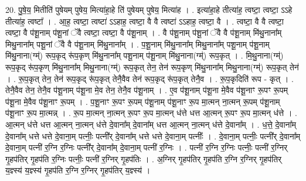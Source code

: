 \documentclass[17pt]{extarticle}
\begin{document}
20. पु॒षे॒य॒ मितीति॑ पुषेयम् पुषेय॒ मित्या॑हा॒हे ति॑ पुषेयम् पुषेय॒ मित्या॑ह । . इत्या॑हा॒हे तीत्या॑ह॒ त्वष्टा॒ त्वष्टा॒ ऽऽहे तीत्या॑ह॒ त्वष्टा᳚ । . आ॒ह॒ त्वष्टा॒ त्वष्टा॑ ऽऽहाह॒ त्वष्टा॒ वै वै त्वष्टा॑ ऽऽहाह॒ त्वष्टा॒ वै । . त्वष्टा॒ वै वै त्वष्टा॒ त्वष्टा॒ वै प॑शू॒नाम् प॑शू॒नां ॅवै त्वष्टा॒ त्वष्टा॒ वै प॑शू॒नाम् । . वै प॑शू॒नाम् प॑शू॒नां ॅवै वै प॑शू॒नाम् मि॑थु॒नाना᳚म् मिथु॒नाना᳚म् पशू॒नां ॅवै वै प॑शू॒नाम् मि॑थु॒नाना᳚म् । . प॒शू॒नाम् मि॑थु॒नाना᳚म् मिथु॒नाना᳚म् पशू॒नाम् प॑शू॒नाम् मि॑थु॒नाना(ग्म्॑) रूप॒कृद् रू॑प॒कृण् मि॑थु॒नाना᳚म् पशू॒नाम् प॑शू॒नाम् मि॑थु॒नाना(ग्म्॑) रूप॒कृत् । . मि॒थु॒नाना(ग्म्॑) रूप॒कृद् रू॑प॒कृण् मि॑थु॒नाना᳚म् मिथु॒नाना(ग्म्॑) रूप॒कृत् तेन॒ तेन॑ रूप॒कृण् मि॑थु॒नाना᳚म् मिथु॒नाना(ग्म्॑) रूप॒कृत् तेन॑ । . रू॒प॒कृत् तेन॒ तेन॑ रूप॒कृद् रू॑प॒कृत् तेनै॒वैव तेन॑ रूप॒कृद् रू॑प॒कृत् तेनै॒व । . रू॒प॒कृदिति॑ रूप - कृत् । . तेनै॒वैव तेन॒ तेनै॒व प॑शू॒नाम् प॑शू॒ना मे॒व तेन॒ तेनै॒व प॑शू॒नाम् । . ए॒व प॑शू॒नाम् प॑शू॒ना मे॒वैव प॑शू॒नाꣳ रू॒पꣳ रू॒पम् प॑शू॒ना मे॒वैव प॑शू॒नाꣳ रू॒पम् । . प॒शू॒नाꣳ रू॒पꣳ रू॒पम् प॑शू॒नाम् प॑शू॒नाꣳ रू॒प मा॒त्मन् ना॒त्मन् रू॒पम् प॑शू॒नाम् प॑शू॒नाꣳ रू॒प मा॒त्मन्न् । . रू॒प मा॒त्मन् ना॒त्मन् रू॒पꣳ रू॒प मा॒त्मन् ध॑त्ते धत्त आ॒त्मन् रू॒पꣳ रू॒प मा॒त्मन् ध॑त्ते । . आ॒त्मन् ध॑त्ते धत्त आ॒त्मन् ना॒त्मन् ध॑त्ते दे॒वाना᳚म् दे॒वाना᳚म् धत्त आ॒त्मन् ना॒त्मन् ध॑त्ते दे॒वाना᳚म् । . ध॒त्ते॒ दे॒वाना᳚म् दे॒वाना᳚म् धत्ते धत्ते दे॒वाना॒म् पत्नीः॒ पत्नी᳚र् दे॒वाना᳚म् धत्ते धत्ते दे॒वाना॒म् पत्नीः᳚ । . दे॒वाना॒म् पत्नीः॒ पत्नी᳚र् दे॒वाना᳚म् दे॒वाना॒म् पत्नी॑ र॒ग्नि र॒ग्निः पत्नी᳚र् दे॒वाना᳚म् दे॒वाना॒म् पत्नी॑ र॒ग्निः । . पत्नी॑ र॒ग्नि र॒ग्निः पत्नीः॒ पत्नी॑ र॒ग्निर् गृ॒हप॑तिर् गृ॒हप॑ति र॒ग्निः पत्नीः॒ पत्नी॑ र॒ग्निर् गृ॒हप॑तिः । . अ॒ग्निर् गृ॒हप॑तिर् गृ॒हप॑ति र॒ग्नि र॒ग्निर् गृ॒हप॑तिर् य॒ज्ञ्स्य॑ य॒ज्ञ्स्य॑ गृ॒हप॑ति र॒ग्नि र॒ग्निर् गृ॒हप॑तिर् य॒ज्ञ्स्य॑ । \newline
\end{document}
